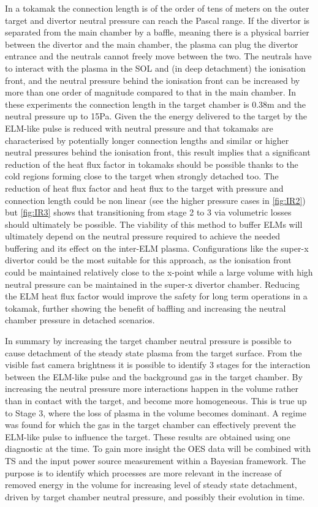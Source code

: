 In a tokamak the connection length is of the order of tens of meters on the outer target and divertor neutral pressure can reach the Pascal range\cite{Kallenbach2018}. If the divertor is separated from the main chamber by a baffle, meaning there is a physical barrier between the divertor and the main chamber, the plasma can plug the divertor entrance and the neutrals cannot freely move between the two. The neutrals have to interact with the plasma in the SOL and (in deep detachment) the ionisation front, and the neutral pressure behind the ionisation front can be increased by more than one order of magnitude compared to that in the main chamber.\cite{Galassi2020,Pitcher2000,Niemczewski1997} In these experiments the connection length in the target chamber is 0.38m and the neutral pressure up to 15Pa. Given the the energy delivered to the target by the ELM-like pulse is reduced with neutral pressure and that tokamaks are characterised by potentially longer connection lengths and similar or higher neutral pressures behind the ionisation front, this result implies that a significant reduction of the heat flux factor in tokamaks should be possible thanks to the cold regions forming close to the target when strongly detached too. The reduction of heat flux factor and heat flux to the target with pressure and connection length could be non linear (see the higher pressure cases in \autoref{fig:IR2}) but \autoref{fig:IR3} shows that transitioning from stage 2 to 3 via volumetric losses should ultimately be possible. The viability of this method to buffer ELMs will ultimately depend on the neutral pressure required to achieve the needed buffering and its effect on the inter-ELM plasma. Configurations like the super-x divertor could be the most suitable for this approach, as the ionisation front could be maintained relatively close to the x-point while a large volume with high neutral pressure can be maintained in the super-x divertor chamber. Reducing the ELM heat flux factor would improve the safety for long term operations in a tokamak, further showing the benefit of baffling and increasing the neutral chamber pressure in detached scenarios.

In summary by increasing the target chamber neutral pressure is possible to cause detachment of the steady state plasma from the target surface. From the visible fast camera brightness it is possible to identify 3 stages for the interaction between the ELM-like pulse and the background gas in the target chamber. By increasing the neutral pressure more interactions happen in the volume rather than in contact with the target, and become more homogeneous. This is true up to Stage 3, where the loss of plasma in the volume becomes dominant. A regime was found for which the gas in the target chamber can effectively prevent the ELM-like pulse to influence the target.
These results are obtained using one diagnostic at the time. To gain more insight the OES data will be combined with TS and the input power source measurement within a Bayesian framework. The purpose is to identify which processes are more relevant in the increase of removed energy in the volume for increasing level of steady state detachment, driven by target chamber neutral pressure, and possibly their evolution in time.

